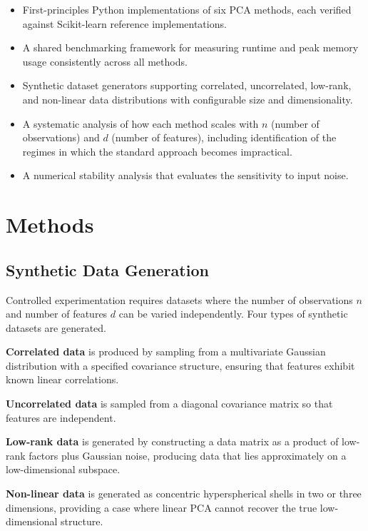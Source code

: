 \begin{itemize}
    \item First-principles Python implementations of six PCA methods, each verified against Scikit-learn reference implementations.
    \item A shared benchmarking framework for measuring runtime and peak memory usage consistently across all methods.
    \item Synthetic dataset generators supporting correlated, uncorrelated, low-rank, and non-linear data distributions with configurable size and     dimensionality.
    \item A systematic analysis of how each method scales with $n$ (number of observations) and $d$ (number of features), including identification of the regimes in which the standard approach becomes impractical.
    \item A numerical stability analysis that evaluates the sensitivity to input noise.
\end{itemize}

\section{Methods}

\subsection{Synthetic Data Generation}

Controlled experimentation requires datasets where the number of observations $n$ and number of features $d$ can be varied independently. Four types of synthetic datasets are generated.
\smallskip

\textbf{Correlated data} is produced by sampling from a multivariate Gaussian distribution with a specified covariance structure, ensuring that features exhibit known linear correlations. 
\smallskip

\textbf{Uncorrelated data} is sampled from a diagonal covariance matrix so that features are independent.
\smallskip

\textbf{Low-rank data} is generated by constructing a data matrix as a product of low-rank factors plus Gaussian noise, producing data that lies approximately on a low-dimensional subspace. 
\smallskip 

\textbf{Non-linear data} is generated as concentric hyperspherical shells in two or three dimensions, providing a case where linear PCA cannot recover the true low-dimensional
structure.
\smallskip

